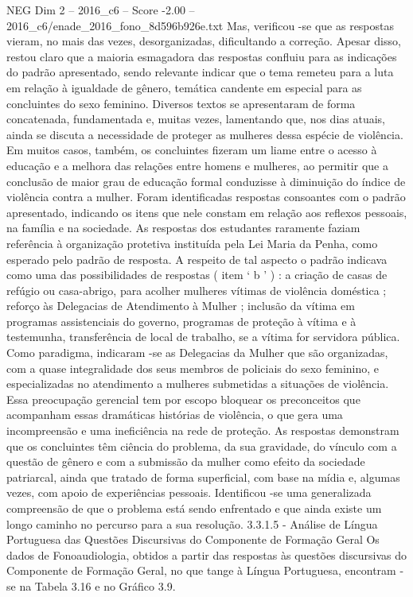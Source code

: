 \begin{textsample}{NEG Dim 2 – 2016\_c6 – Score -2.00 – 2016\_c6/enade\_2016\_fono\_8d596b926e.txt}
Mas, verificou -se que as respostas vieram, no mais das vezes, desorganizadas, dificultando a correção.
Apesar disso, restou claro que a maioria esmagadora das respostas confluiu para as indicações do padrão apresentado, sendo relevante indicar que o tema remeteu para a luta em relação à igualdade de gênero, temática candente em especial para as concluintes do sexo feminino.
Diversos textos se apresentaram de forma concatenada, fundamentada e, muitas vezes, lamentando que, nos dias atuais, ainda se discuta a necessidade de proteger as mulheres dessa espécie de violência.
Em muitos casos, também, os concluintes fizeram um liame entre o acesso à educação e a melhora das relações entre homens e mulheres, ao permitir que a conclusão de maior grau de educação formal conduzisse à diminuição do índice de violência contra a mulher.
Foram identificadas respostas consoantes com o padrão apresentado, indicando os itens que nele constam em relação aos reflexos pessoais, na família e na sociedade.
As respostas dos estudantes raramente faziam referência à organização protetiva instituída pela Lei Maria da Penha, como esperado pelo padrão de resposta.
A respeito de tal aspecto o padrão indicava como uma das possibilidades de respostas ( item ‘ b ’ ) : a criação de casas de refúgio ou casa-abrigo, para acolher mulheres vítimas de violência doméstica ; reforço às Delegacias de Atendimento à Mulher ; inclusão da vítima em programas assistenciais do governo, programas de proteção à vítima e à testemunha, transferência de local de trabalho, se a vítima for servidora pública.
Como paradigma, indicaram -se as Delegacias da Mulher que são organizadas, com a quase integralidade dos seus membros de policiais do sexo feminino, e especializadas no atendimento a mulheres submetidas a situações de violência.
Essa preocupação gerencial tem por escopo bloquear os preconceitos que acompanham essas dramáticas histórias de violência, o que gera uma incompreensão e uma ineficiência na rede de proteção.
As respostas demonstram que os concluintes têm ciência do problema, da sua gravidade, do vínculo com a questão de gênero e com a submissão da mulher como efeito da sociedade patriarcal, ainda que tratado de forma superficial, com base na mídia e, algumas vezes, com apoio de experiências pessoais.
Identificou -se uma generalizada compreensão de que o problema está sendo enfrentado e que ainda existe um longo caminho no percurso para a sua resolução. 3.3.1.5 - Análise de Língua Portuguesa das Questões Discursivas do Componente de Formação Geral Os dados de Fonoaudiologia, obtidos a partir das respostas às questões discursivas do Componente de Formação Geral, no que tange à Língua Portuguesa, encontram -se na Tabela 3.16 e no Gráfico 3.9.

\end{textsample}
